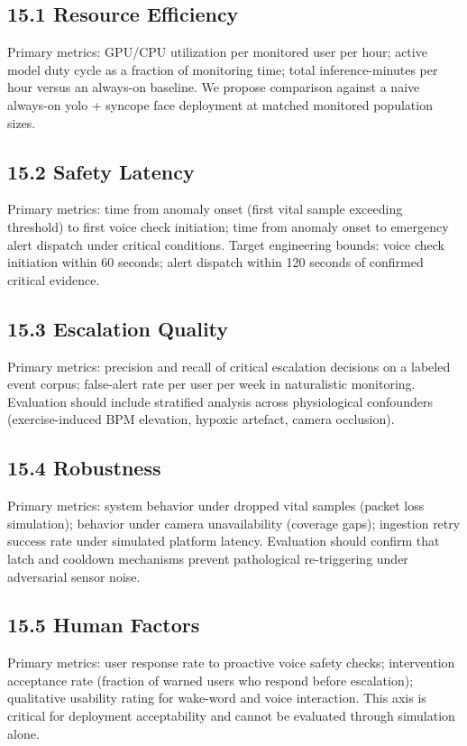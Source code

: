\documentclass[11pt,a4paper]{article}
\begin{document}
\subsection{15.1 Resource Efficiency}
Primary metrics: GPU/CPU utilization per monitored user per hour; active model duty cycle as a fraction of monitoring time; total inference-minutes per hour versus an always-on baseline. We propose comparison against a naive always-on \gls{yolo} + syncope face deployment at matched monitored population sizes.

\subsection{15.2 Safety Latency}
Primary metrics: time from anomaly onset (first vital sample exceeding threshold) to first voice check initiation; time from anomaly onset to emergency alert dispatch under critical conditions. Target engineering bounds: voice check initiation within 60 seconds; alert dispatch within 120 seconds of confirmed critical evidence.

\subsection{15.3 Escalation Quality}
Primary metrics: precision and recall of critical escalation decisions on a labeled event corpus; false-alert rate per user per week in naturalistic monitoring. Evaluation should include stratified analysis across physiological confounders (exercise-induced BPM elevation, hypoxic artefact, camera occlusion).

\subsection{15.4 Robustness}
Primary metrics: system behavior under dropped vital samples (packet loss simulation); behavior under camera unavailability (coverage gaps); ingestion retry success rate under simulated platform latency. Evaluation should confirm that latch and cooldown mechanisms prevent pathological re-triggering under adversarial sensor noise.

\subsection{15.5 Human Factors}
Primary metrics: user response rate to proactive voice safety checks; intervention acceptance rate (fraction of warned users who respond before escalation); qualitative usability rating for wake-word and voice interaction. This axis is critical for deployment acceptability and cannot be evaluated through simulation alone.
\end{document}
